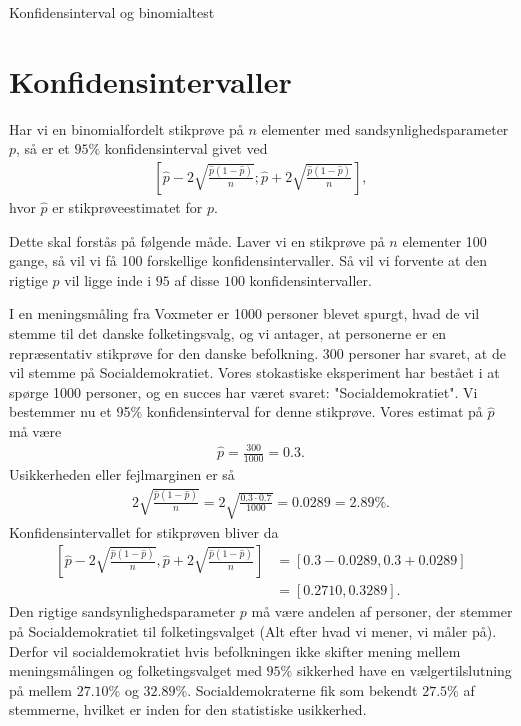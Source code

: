 
\begin{center}
\Huge
Konfidensinterval og binomialtest
\end{center}
\section*{Konfidensintervaller}
\begin{setn}
Har vi en binomialfordelt stikprøve på $n$ elementer med sandsynlighedsparameter $p$, så er et $95\%$ konfidensinterval givet ved
\begin{align*}
\left[ \hat{p} - 2\sqrt{\frac{\hat{p}(1-\hat{p})}{n}};\hat{p} + 2\sqrt{\frac{\hat{p}(1-\hat{p})}{n}}\right],
\end{align*}
hvor $\hat{p}$ er stikprøveestimatet for $p$. 
\end{setn}
Dette skal forstås på følgende måde. Laver vi en stikprøve på $n$ elementer 100 gange, så vil vi få 100 forskellige konfidensintervaller. Så vil vi forvente at den rigtige $p$ vil ligge inde i $95$ af disse $100$ konfidensintervaller.

\begin{exa}
	I en meningsmåling fra Voxmeter er 1000 personer blevet spurgt, hvad de vil stemme til det danske folketingsvalg, og vi antager, at personerne er en repræsentativ stikprøve
	for den danske befolkning. 300 personer har svaret, at de vil stemme på Socialdemokratiet. Vores stokastiske eksperiment har bestået i at spørge 1000 personer, og en succes har været svaret:
	"Socialdemokratiet". Vi bestemmer nu et 95$\%$ konfidensinterval for denne stikprøve.
	Vores estimat på $\hat{p}$ må være
	\begin{align*}
		\hat{p} = \frac{300}{1000} = 0.3.
	\end{align*}
	Usikkerheden eller fejlmarginen er så
	\begin{align*}
		2\sqrt{\frac{\hat{p}(1-\hat{p})}{n}} = 2\sqrt{\frac{0.3\cdot 0.7}{1000}} = 0.0289 = 2.89\%.
	\end{align*}
	Konfidensintervallet for stikprøven bliver da
	\begin{align*}
		\left[\hat{p}-2\sqrt{\frac{\hat{p}(1-\hat{p})}{n}},\hat{p}+2\sqrt{\frac{\hat{p}(1-\hat{p})}{n}}\right] &= [0.3-0.0289,0.3+0.0289] \\
		&=[0.2710,0.3289].
	\end{align*}
	Den rigtige sandsynlighedsparameter $p$ må være andelen af personer, der stemmer på Socialdemokratiet til folketingsvalget (Alt efter hvad vi mener, vi måler på). Derfor
	vil socialdemokratiet hvis befolkningen ikke skifter mening mellem meningsmålingen og folketingsvalget med $95\%$ sikkerhed have en vælgertilslutning på mellem $27.10\%$ og $32.89\%$. 
	Socialdemokraterne fik som bekendt $27.5\%$ af stemmerne, hvilket er inden for den statistiske usikkerhed. 
\end{exa}

